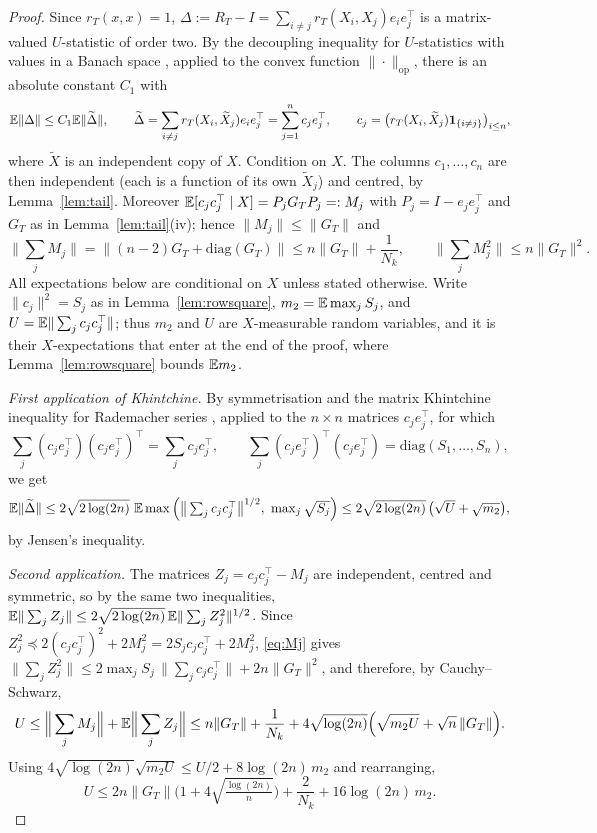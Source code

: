 \begin{proof}
Since $r_T(x,x)=1$, $\Delta:=R_T-I=\sum_{i\ne j}r_T(X_i,X_j)e_ie_j^\top$ is a matrix-valued $U$-statistic of
order two. By the decoupling inequality for $U$-statistics with values in a Banach space
\cite{dlPMS,dlPG}, applied to the convex function $\|\cdot\|_{\mathrm{op}}$, there is an absolute constant $C_1$ with
\[
\mathbb{E}\|\Delta\|\le C_1\mathbb{E}\|\widetilde\Delta\|,\qquad
\widetilde\Delta=\sum_{i\ne j}r_T(X_i,\widetilde X_j)e_ie_j^\top=\sum_{j=1}^nc_je_j^\top,
\qquad c_j=\big(r_T(X_i,\widetilde X_j)\mathbf 1_{\{i\ne j\}}\big)_{i\le n},
\]
where $\widetilde X$ is an independent copy of $X$. Condition on $X$. The columns $c_1,\dots,c_n$ are then
independent (each is a function of its own $\widetilde X_j$) and centred, by Lemma~\ref{lem:tail}. Moreover
$\mathbb{E}[c_jc_j^\top\mid X]=P_jG_TP_j=:M_j$ with $P_j=I-e_je_j^\top$ and $G_T$ as in Lemma~\ref{lem:tail}(iv);
hence $\|M_j\|\le\|G_T\|$ and
\begin{equation}
\Big\|\sum_jM_j\Big\|=\big\|(n-2)G_T+\mathrm{diag}(G_T)\big\|\le n\|G_T\|+\frac1{N_k},
\qquad \Big\|\sum_jM_j^2\Big\|\le n\|G_T\|^2 .
\label{eq:Mj}
\end{equation}
All expectations below are conditional on $X$ unless stated otherwise. Write $\|c_j\|^2=S_j$ as in
Lemma~\ref{lem:rowsquare}, $m_2=\mathbb{E}\max_jS_j$, and $U=\mathbb{E}\|\sum_jc_jc_j^\top\|$; thus $m_2$ and $U$ are
$X$-measurable random variables, and it is their $X$-expectations that enter at the end of the proof, where
Lemma~\ref{lem:rowsquare} bounds $\mathbb{E} m_2$.

\emph{First application of Khintchine.} By symmetrisation \cite[Lemma~6.3]{LedouxTalagrand} and the matrix
Khintchine inequality for Rademacher series \cite[Theorem~4.1.1]{Tropp15}, applied to the $n\times n$ matrices
$c_je_j^\top$, for which
\[
\sum_j(c_je_j^\top)(c_je_j^\top)^\top=\sum_jc_jc_j^\top,\qquad
\sum_j(c_je_j^\top)^\top(c_je_j^\top)=\mathrm{diag}(S_1,\dots,S_n),
\]
we get
\begin{equation}
\E\|\widetilde\Delta\|\le2\sqrt{2\log(2n)}\ \E\max\Big(\big\|\textstyle\sum_jc_jc_j^\top\big\|^{1/2},\ \max_j\sqrt{S_j}\Big)
\le2\sqrt{2\log(2n)}\,\big(\sqrt U+\sqrt{m_2}\big),
\label{eq:K1}
\end{equation}
by Jensen's inequality.

\emph{Second application.} The matrices $Z_j=c_jc_j^\top-M_j$ are independent, centred and symmetric, so by
the same two inequalities, $\mathbb{E}\|\sum_jZ_j\|\le2\sqrt{2\log(2n)}\,\mathbb{E}\|\sum_jZ_j^2\|^{1/2}$. Since
$Z_j^2\preceq2(c_jc_j^\top)^2+2M_j^2=2S_jc_jc_j^\top+2M_j^2$, \eqref{eq:Mj} gives
$\|\sum_jZ_j^2\|\le2\max_jS_j\,\|\sum_jc_jc_j^\top\|+2n\|G_T\|^2$, and therefore, by Cauchy--Schwarz,
\[
U\le\Big\|\sum_jM_j\Big\|+\mathbb{E}\Big\|\sum_jZ_j\Big\|
\le n\|G_T\|+\frac1{N_k}+4\sqrt{\log(2n)}\Big(\sqrt{m_2U}+\sqrt n\,\|G_T\|\Big).
\]
Using $4\sqrt{\log(2n)}\sqrt{m_2U}\le U/2+8\log(2n)\,m_2$ and rearranging,
\begin{equation}
U\le2n\|G_T\|\Big(1+4\sqrt{\tfrac{\log(2n)}{n}}\Big)+\frac2{N_k}+16\log(2n)\,m_2 .
\label{eq:U}
\end{equation}


\end{proof}
